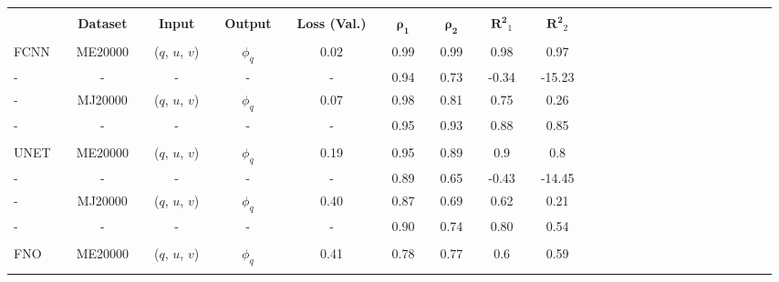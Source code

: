 \bgroup
\def\arraystretch{1.5}
\begin{table}[H]
\hspace{-0.85cm}
\begin{tabular}{llclclclclclclclclclclclclclclcl}
\Xhline{1.5pt}\\[-1.5em]
\textbf{} &  & \textbf{Dataset} &  & \textbf{Input} &  & \textbf{Output} &  & \textbf{Loss (Val.)} &  & $\boldsymbol{\rho_{1}}$ &  & $\boldsymbol{\rho_{2}}$ &  & $\boldsymbol{R^2}_1$ &  & $\boldsymbol{R^2}_2$ \\[0.4em] 
\cline{1-1} \cline{3-3} \cline{5-5} \cline{7-7} \cline{9-9} \cline{11-11} \cline{13-13} \cline{15-15} \cline{17-17} \\[-1.4em]
FCNN        &  & ME20000          &  & ($q$, $u$, $v$)  &  & $\phi_q$ &  & 0.02          &  & 0.99            &  & 0.99            &  & 0.98           &  & 0.97           \\ \rowcolor{Gray}
-     		&  & -                &  & -				&  & -        &  & -              &  & 0.94            &  & 0.73            &  & -0.34          &  & -15.23             \\ 
-     		&  & MJ20000          &  & ($q$, $u$, $v$)  &  & $\phi_q$ &  & 0.07          &  & 0.98            &  & 0.81            &  & 0.75           &  & 0.26           \\ \rowcolor{Gray}
-     		&  & -                &  & -				&  & -        &  & -              &  & 0.95            &  & 0.93            &  & 0.88           &  & 0.85           \\ 
\hline \\[-1.4em]
UNET        &  & ME20000          &  & ($q$, $u$, $v$)  &  & $\phi_q$ &  & 0.19          &  & 0.95            &  & 0.89            &  & 0.9            &  & 0.8           \\ \rowcolor{Gray}
-     		&  & -                &  & -				&  & -        &  & -              &  & 0.89            &  & 0.65            &  & -0.43          &  & -14.45             \\ 
-     		&  & MJ20000          &  & ($q$, $u$, $v$)  &  & $\phi_q$ &  & 0.40          &  & 0.87            &  & 0.69            &  & 0.62           &  & 0.21           \\ \rowcolor{Gray}
-     		&  & -                &  & -				&  & -        &  & -              &  & 0.90            &  & 0.74            &  & 0.80           &  & 0.54           \\ 
\hline \\[-1.4em]
FNO         &  & ME20000          &  & ($q$, $u$, $v$)  &  & $\phi_q$ &  & 0.41          &  & 0.78            &  & 0.77            &  & 0.6            &  & 0.59           \\ \rowcolor{Gray}

\end{tabular}
\end{table}
